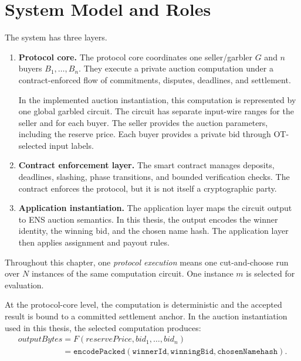 \documentclass[final,twoside]{vutinfth}
\begin{document}
\section{System Model and Roles}
The system has three layers.

\begin{enumerate}
    \item \textbf{Protocol core.}
    The protocol core coordinates one seller/garbler $G$ and $n$ buyers
    $B_1, \ldots, B_n$. They execute a private auction computation under a
    contract-enforced flow of commitments, disputes, deadlines, and settlement.

    In the implemented auction instantiation, this computation is represented by
    one global garbled circuit. The circuit has separate input-wire ranges for
    the seller and for each buyer. The seller provides the auction parameters,
    including the reserve price. Each buyer provides a private bid through
    OT-selected input labels.

    \item \textbf{Contract enforcement layer.}
    The smart contract manages deposits, deadlines, slashing, phase transitions,
    and bounded verification checks. The contract enforces the protocol, but it
    is not itself a cryptographic party.

    \item \textbf{Application instantiation.}
    The application layer maps the circuit output to ENS auction semantics. In
    this thesis, the output encodes the winner identity, the winning bid, and the
    chosen name hash. The application layer then applies assignment and payout
    rules.
\end{enumerate}

Throughout this chapter, one \emph{protocol execution} means one cut-and-choose
run over $N$ instances of the same computation circuit. One instance $m$ is
selected for evaluation.

At the protocol-core level, the computation is deterministic and the accepted
result is bound to a committed settlement anchor. In the auction instantiation
used in this thesis, the selected computation produces:
\[
\begin{array}{l}
outputBytes = F(reservePrice, bid_1, \ldots, bid_n) \\
\phantom{outputBytes} = \texttt{encodePacked}(\texttt{winnerId}, \texttt{winningBid}, \texttt{chosenNamehash}).
\end{array}
\]
\end{document}
